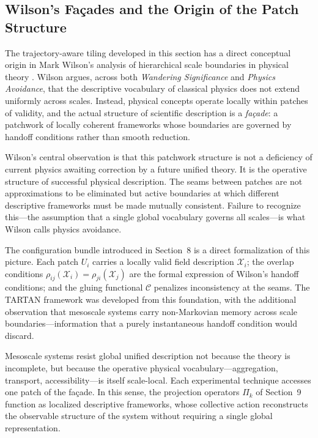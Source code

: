 \documentclass[11pt, a4paper, twocolumn]{article}
\newcommand{\X}{\mathcal{X}}
\begin{document}
\subsection{Wilson's Fa\c{c}ades and the Origin of the Patch Structure}

The trajectory-aware tiling developed in this section has a direct conceptual
origin in Mark Wilson's analysis of hierarchical scale boundaries in physical
theory \cite{wilson2006,wilson2017}. Wilson argues, across both
\textit{Wandering Significance} and \textit{Physics Avoidance}, that the
descriptive vocabulary of classical physics does not extend uniformly across
scales. Instead, physical concepts operate locally within patches of validity,
and the actual structure of scientific description is a \textit{fa\c{c}ade}:
a patchwork of locally coherent frameworks whose boundaries are governed by
handoff conditions rather than smooth reduction.

Wilson's central observation is that this patchwork structure is not a
deficiency of current physics awaiting correction by a future unified theory.
It is the operative structure of successful physical description. The seams
between patches are not approximations to be eliminated but active boundaries
at which different descriptive frameworks must be made mutually consistent.
Failure to recognize this---the assumption that a single global vocabulary
governs all scales---is what Wilson calls physics avoidance.

The configuration bundle introduced in Section~8 is a direct formalization of
this picture. Each patch $U_i$ carries a locally valid field description
$\X_i$; the overlap conditions $\rho_{ij}(\X_i) = \rho_{ji}(\X_j)$ are the
formal expression of Wilson's handoff conditions; and the gluing functional
$\mathcal{C}$ penalizes inconsistency at the seams. The TARTAN framework was
developed from this foundation, with the additional observation that mesoscale
systems carry non-Markovian memory across scale boundaries---information that
a purely instantaneous handoff condition would discard.

Mesoscale systems resist global unified description not because the theory is
incomplete, but because the operative physical vocabulary---aggregation,
transport, accessibility---is itself scale-local. Each experimental technique
accesses one patch of the fa\c{c}ade. In this sense, the projection operators
$\Pi_k$ of Section~9 function as localized descriptive frameworks, whose
collective action reconstructs the observable structure of the system without
requiring a single global representation.
\end{document}

